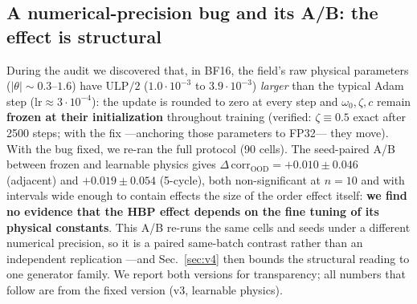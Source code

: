 \documentclass{article}
\begin{document}
\subsection{A numerical-precision bug and its A/B: the effect is structural}
\label{sec:bf16}
During the audit we discovered that, in BF16, the field's raw physical parameters
($|\theta|\sim0.3$--$1.6$) have $\mathrm{ULP}/2$ ($1.0{\cdot}10^{-3}$ to
$3.9{\cdot}10^{-3}$) \emph{larger} than the typical Adam step
($\mathrm{lr}\approx3{\cdot}10^{-4}$): the update is rounded to zero at every
step and $\omega_0,\zeta,c$ remain \textbf{frozen at their initialization}
throughout training (verified: $\zeta\equiv0.5$ exact after 2500 steps; with the
fix ---anchoring those parameters to FP32--- they move). With the bug fixed, we
re-ran the full protocol (90 cells). The seed-paired A/B between frozen and
learnable physics gives
$\Delta\,\mathrm{corr}_{\mathrm{OOD}}=+0.010\pm0.046$ (adjacent) and
$+0.019\pm0.054$ (5-cycle), both non-significant at $n{=}10$ and with intervals
wide enough to contain effects the size of the order effect itself:
\textbf{we find no evidence that the HBP effect depends on the fine tuning of
its physical constants}. This A/B re-runs the same cells and seeds under a
different numerical precision, so it is a paired same-batch contrast rather
than an independent replication ---and Sec.~\ref{sec:v4} then bounds the
structural reading to one generator family.
We report both versions for transparency; all numbers that follow are
from the fixed version (v3, learnable physics).
\end{document}
